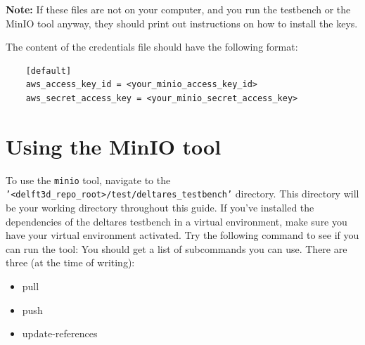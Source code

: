 \documentclass{deltares_memo}
\begin{document}
\textbf{Note:} If these files are not on your computer, and you run the testbench or the MinIO tool anyway, they should print out instructions on how to install the keys.

The content of the credentials file should have the following format:
\begin{verbatim}
	[default]
	aws_access_key_id = <your_minio_access_key_id>
	aws_secret_access_key = <your_minio_secret_access_key>
\end{verbatim}


\section{Using the MinIO tool}
To use the \texttt{minio} tool, navigate to the \texttt{'<delft3d\_repo\_root>/test/deltares\_testbench'} directory. This directory will be your working directory throughout this guide. If you've installed the dependencies of the deltares testbench in a virtual environment, make sure you have your virtual environment activated. Try the following command to see if you can run the tool:
\newline
{}
\newline
\newline
You should get a list of subcommands you can use. There are three (at the time of writing):
\newline
\begin{itemize}
	\item pull
	\item push
	\item update-references
\end{itemize}
\end{document}
